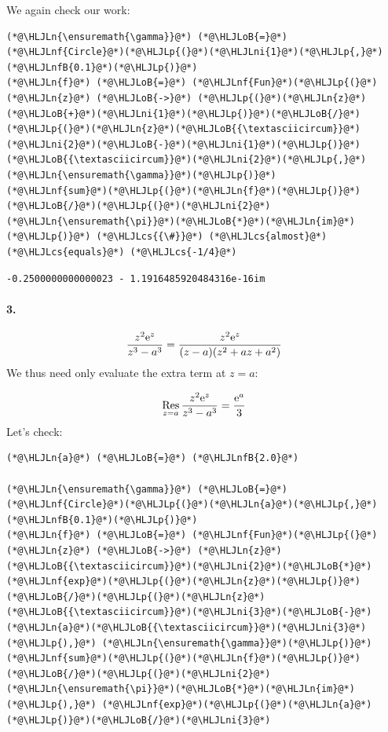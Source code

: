 \documentclass[12pt,a4paper]{article}
\newcommand{\HLJLn}[1]{#1}
\newcommand{\HLJLnf}[1]{\textcolor[RGB]{66,102,213}{#1}}
\newcommand{\HLJLnfB}[1]{\textcolor[RGB]{59,151,46}{#1}}
\newcommand{\HLJLni}[1]{\textcolor[RGB]{59,151,46}{#1}}
\newcommand{\HLJLoB}[1]{\textcolor[RGB]{102,102,102}{\textbf{#1}}}
\newcommand{\HLJLp}[1]{#1}
\newcommand{\HLJLcs}[1]{\textcolor[RGB]{153,153,119}{\textit{#1}}}
\def\E{ {\rm e} }
\def\Res_#1{\underset{#1}{\rm Res}\,}
\begin{document}
We again check our work:


\begin{lstlisting}
(*@\HLJLn{\ensuremath{\gamma}}@*) (*@\HLJLoB{=}@*) (*@\HLJLnf{Circle}@*)(*@\HLJLp{(}@*)(*@\HLJLni{1}@*)(*@\HLJLp{,}@*) (*@\HLJLnfB{0.1}@*)(*@\HLJLp{)}@*)
(*@\HLJLn{f}@*) (*@\HLJLoB{=}@*) (*@\HLJLnf{Fun}@*)(*@\HLJLp{(}@*)(*@\HLJLn{z}@*) (*@\HLJLoB{->}@*) (*@\HLJLp{(}@*)(*@\HLJLn{z}@*)(*@\HLJLoB{+}@*)(*@\HLJLni{1}@*)(*@\HLJLp{)}@*)(*@\HLJLoB{/}@*)(*@\HLJLp{(}@*)(*@\HLJLn{z}@*)(*@\HLJLoB{{\textasciicircum}}@*)(*@\HLJLni{2}@*)(*@\HLJLoB{-}@*)(*@\HLJLni{1}@*)(*@\HLJLp{)}@*)(*@\HLJLoB{{\textasciicircum}}@*)(*@\HLJLni{2}@*)(*@\HLJLp{,}@*) (*@\HLJLn{\ensuremath{\gamma}}@*)(*@\HLJLp{)}@*)
(*@\HLJLnf{sum}@*)(*@\HLJLp{(}@*)(*@\HLJLn{f}@*)(*@\HLJLp{)}@*)(*@\HLJLoB{/}@*)(*@\HLJLp{(}@*)(*@\HLJLni{2}@*)(*@\HLJLn{\ensuremath{\pi}}@*)(*@\HLJLoB{*}@*)(*@\HLJLn{im}@*)(*@\HLJLp{)}@*) (*@\HLJLcs{{\#}}@*) (*@\HLJLcs{almost}@*) (*@\HLJLcs{equals}@*) (*@\HLJLcs{-1/4}@*)
\end{lstlisting}

\begin{lstlisting}
-0.2500000000000023 - 1.1916485920484316e-16im
\end{lstlisting}


\paragraph{3.}
\[
{z^2 \E^z \over z^3 - a^3} = {z^2 \E^z \over (z-a) (z^2 + az + a^2)}
\]
We thus need only evaluate the extra term at $z=a$:

\[
\Res_{z = a} {z^2 \E^z \over z^3 - a^3} = {\E^a \over 3}
\]
Let's check:


\begin{lstlisting}
(*@\HLJLn{a}@*) (*@\HLJLoB{=}@*) (*@\HLJLnfB{2.0}@*)

(*@\HLJLn{\ensuremath{\gamma}}@*) (*@\HLJLoB{=}@*) (*@\HLJLnf{Circle}@*)(*@\HLJLp{(}@*)(*@\HLJLn{a}@*)(*@\HLJLp{,}@*) (*@\HLJLnfB{0.1}@*)(*@\HLJLp{)}@*)
(*@\HLJLn{f}@*) (*@\HLJLoB{=}@*) (*@\HLJLnf{Fun}@*)(*@\HLJLp{(}@*)(*@\HLJLn{z}@*) (*@\HLJLoB{->}@*) (*@\HLJLn{z}@*)(*@\HLJLoB{{\textasciicircum}}@*)(*@\HLJLni{2}@*)(*@\HLJLoB{*}@*)(*@\HLJLnf{exp}@*)(*@\HLJLp{(}@*)(*@\HLJLn{z}@*)(*@\HLJLp{)}@*)(*@\HLJLoB{/}@*)(*@\HLJLp{(}@*)(*@\HLJLn{z}@*)(*@\HLJLoB{{\textasciicircum}}@*)(*@\HLJLni{3}@*)(*@\HLJLoB{-}@*)(*@\HLJLn{a}@*)(*@\HLJLoB{{\textasciicircum}}@*)(*@\HLJLni{3}@*)(*@\HLJLp{),}@*) (*@\HLJLn{\ensuremath{\gamma}}@*)(*@\HLJLp{)}@*)
(*@\HLJLnf{sum}@*)(*@\HLJLp{(}@*)(*@\HLJLn{f}@*)(*@\HLJLp{)}@*)(*@\HLJLoB{/}@*)(*@\HLJLp{(}@*)(*@\HLJLni{2}@*)(*@\HLJLn{\ensuremath{\pi}}@*)(*@\HLJLoB{*}@*)(*@\HLJLn{im}@*)(*@\HLJLp{),}@*) (*@\HLJLnf{exp}@*)(*@\HLJLp{(}@*)(*@\HLJLn{a}@*)(*@\HLJLp{)}@*)(*@\HLJLoB{/}@*)(*@\HLJLni{3}@*)
\end{lstlisting}
\end{document}
